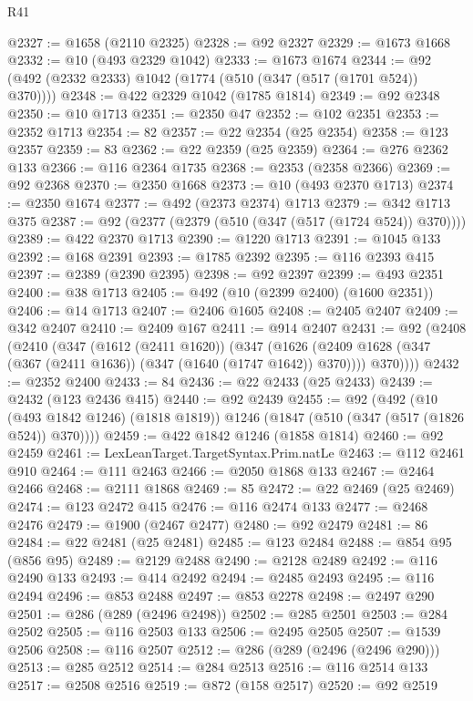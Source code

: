 \begin{lexlean}{R41}
\begin{coremodule}
@2327 := @1658 (@2110 @2325)
@2328 := @92 @2327
@2329 := @1673 @1668
@2332 := @10 (@493 @2329 @1042)
@2333 := @1673 @1674
@2344 := @92 (@492 (@2332 @2333) @1042 (@1774 (@510 (@347 (@517 (@1701 @524)) @370))))
@2348 := @422 @2329 @1042 (@1785 @1814)
@2349 := @92 @2348
@2350 := @10 @1713
@2351 := @2350 @47
@2352 := @102 @2351
@2353 := @2352 @1713
@2354 := 82
@2357 := @22 @2354 (@25 @2354)
@2358 := @123 @2357
@2359 := 83
@2362 := @22 @2359 (@25 @2359)
@2364 := @276 @2362 @133
@2366 := @116 @2364 @1735
@2368 := @2353 (@2358 @2366)
@2369 := @92 @2368
@2370 := @2350 @1668
@2373 := @10 (@493 @2370 @1713)
@2374 := @2350 @1674
@2377 := @492 (@2373 @2374) @1713
@2379 := @342 @1713 @375
@2387 := @92 (@2377 (@2379 (@510 (@347 (@517 (@1724 @524)) @370))))
@2389 := @422 @2370 @1713
@2390 := @1220 @1713
@2391 := @1045 @133
@2392 := @168 @2391
@2393 := @1785 @2392
@2395 := @116 @2393 @415
@2397 := @2389 (@2390 @2395)
@2398 := @92 @2397
@2399 := @493 @2351
@2400 := @38 @1713
@2405 := @492 (@10 (@2399 @2400) (@1600 @2351))
@2406 := @14 @1713
@2407 := @2406 @1605
@2408 := @2405 @2407
@2409 := @342 @2407
@2410 := @2409 @167
@2411 := @914 @2407
@2431 := @92
    (@2408
      (@2410
        (@347
          (@1612 (@2411 @1620))
          (@347
            (@1626 (@2409 @1628 (@347 (@367 (@2411 @1636)) (@347 (@1640 (@1747 @1642)) @370))))
            @370))))
@2432 := @2352 @2400
@2433 := 84
@2436 := @22 @2433 (@25 @2433)
@2439 := @2432 (@123 @2436 @415)
@2440 := @92 @2439
@2455 := @92
    (@492
      (@10 (@493 @1842 @1246) (@1818 @1819))
      @1246
      (@1847 (@510 (@347 (@517 (@1826 @524)) @370))))
@2459 := @422 @1842 @1246 (@1858 @1814)
@2460 := @92 @2459
@2461 := LexLeanTarget.TargetSyntax.Prim.natLe
@2463 := @112 @2461 @910
@2464 := @111 @2463
@2466 := @2050 @1868 @133
@2467 := @2464 @2466
@2468 := @2111 @1868
@2469 := 85
@2472 := @22 @2469 (@25 @2469)
@2474 := @123 @2472 @415
@2476 := @116 @2474 @133
@2477 := @2468 @2476
@2479 := @1900 (@2467 @2477)
@2480 := @92 @2479
@2481 := 86
@2484 := @22 @2481 (@25 @2481)
@2485 := @123 @2484
@2488 := @854 @95 (@856 @95)
@2489 := @2129 @2488
@2490 := @2128 @2489
@2492 := @116 @2490 @133
@2493 := @414 @2492
@2494 := @2485 @2493
@2495 := @116 @2494
@2496 := @853 @2488
@2497 := @853 @2278
@2498 := @2497 @290
@2501 := @286 (@289 (@2496 @2498))
@2502 := @285 @2501
@2503 := @284 @2502
@2505 := @116 @2503 @133
@2506 := @2495 @2505
@2507 := @1539 @2506
@2508 := @116 @2507
@2512 := @286 (@289 (@2496 (@2496 @290)))
@2513 := @285 @2512
@2514 := @284 @2513
@2516 := @116 @2514 @133
@2517 := @2508 @2516
@2519 := @872 (@158 @2517)
@2520 := @92 @2519

\end{coremodule}
\end{lexlean}
